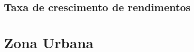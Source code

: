 \documentclass[10pt]{beamer}
\begin{document}
\begin{frame}
\textit{\hyperlink{indice_principal_amz}{}}

\end{frame}

\begin{frame}
\textit{\hyperlink{indice_principal_amz}{}}

\end{frame}

\subsection{Taxa de crescimento de rendimentos}

\begin{frame}
\textit{\hyperlink{indice_principal_amz}{}}

\end{frame}

\begin{frame}
\textit{\hyperlink{indice_principal_amz}{}}

\end{frame}

\begin{frame}
\textit{\hyperlink{indice_principal_amz}{}}

\end{frame}

\section{Zona Urbana}
\end{document}
